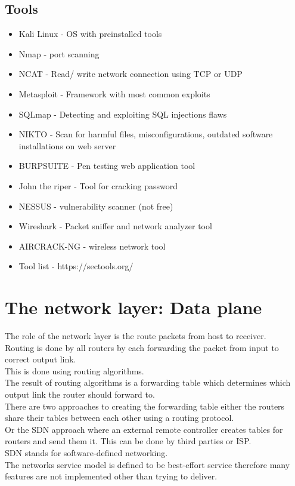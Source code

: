 \documentclass[12pt, a4paper]{article}
\begin{document}
		\subsection{Tools}
			\begin{itemize}
				\item Kali Linux - OS with preinstalled tools
				\item Nmap - port scanning
				\item NCAT - Read/ write network connection using TCP or UDP
				\item Metasploit - Framework with most common exploits
				\item SQLmap - Detecting and exploiting SQL injections flaws
				\item NIKTO - Scan for harmful files, misconfigurations, outdated software installations on web server
				\item BURPSUITE - Pen testing web application tool
				\item John the riper - Tool for cracking password
				\item NESSUS - vulnerability scanner (not free)
				\item Wireshark - Packet sniffer and network analyzer tool
				\item AIRCRACK-NG - wireless network tool
				\item Tool list - https://sectools.org/
			\end{itemize}
	\section{The network layer: Data plane}
		The role of the network layer is the route packets from host to receiver.\\
		Routing is done by all routers by each forwarding the packet from input to correct output link.\\
		This is done using routing algorithms.\\
		The result of routing algorithms is a forwarding table which determines which output link the router should forward to.\\
		There are two approaches to creating the forwarding table either the routers share their tables between each other using a routing protocol.\\
		Or the SDN approach where an external remote controller creates tables for routers and send them it. This can be done by third parties or ISP.\\
		SDN stands for software-defined networking.\\
		The networks service model is defined to be best-effort service therefore many features are not implemented other than trying to deliver.
\end{document}
